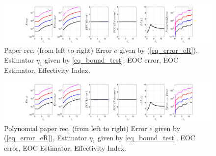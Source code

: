 \documentclass[12pt,a4paper]{article}
\numberwithin{equation}{section}
\theoremstyle{definition}
\begin{document}
\begin{figure}[H]
	\hspace{-3cm}
	\includegraphics[scale=0.55]{fig_LeapFrogplots_1x5_sin_IC_harmonic_u6_v4_paperrec}	
	\caption{Paper rec. (from left to right) Error $e$ given by (\ref{eq_error_eR}), Estimator $\eta_1$ given by \ref{eq_bound_test},  EOC error, EOC Estimator, Effectivity Index.}
	\label{fig_all_in_one_paperrec_u06_v04}
\end{figure}
\begin{figure}[H]
	\hspace{-3cm}
	\includegraphics[scale=0.55]{fig_LeapFrogplots_1x5_sin_IC_harmonic_u6_v4_paperrec_poly}	
	\caption{Polynomial paper rec. (from left to right) Error $e$ given by (\ref{eq_error_eR}), Estimator $\eta_1$ given by \ref{eq_bound_test},  EOC error, EOC Estimator, Effectivity Index.}
	\label{fig_all_in_one_paperrec_poly_u06_v04}
\end{figure}
\end{document}
